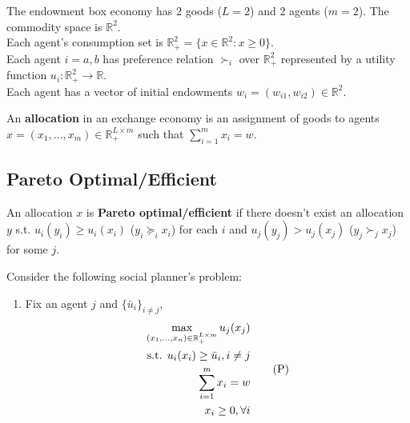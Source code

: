 \documentclass[11pt]{elegantbook}
\begin{document}
\begin{example}
    The endowment box economy has $2$ goods ($L=2$) and 2 agents ($m=2$). The commodity space is $\mathbb{R}^2$.\\
    Each agent's consumption set is $\mathbb{R}_+^2=\{x\in \mathbb{R}^2:x\geq 0\}$.\\
    Each agent $i=a,b$ has preference relation $\succ_i$ over $\mathbb{R}_+^2$ represented by a utility function $u_i: \mathbb{R}_+^2 \rightarrow \mathbb{R}$.\\
    Each agent has a vector of initial endowments $w_i=(w_{i1},w_{i2})\in \mathbb{R}^2$.
\end{example}

\begin{definition}[Allocation]
    \normalfont
    An \textbf{allocation} in an exchange economy is an assignment of goods to agents $x=(x_1,...,x_m)\in \mathbb{R}_+^{L\times m}$ such that $\sum_{i=1}^mx_i=w$.
\end{definition}


\subsection{Pareto Optimal/Efficient}
\begin{definition}
    \normalfont
    An allocation $x$ is \textbf{Pareto optimal/efficient} if there doesn't exist an allocation $y$ s.t. $u_i(y_i)\geq u_i(x_i)$ ($y_i\succeq_i x_i$) for each $i$ and $u_j(y_j)> u_j(x_j)$ ($y_j\succ_j x_j$) for some $j$.
\end{definition}

Consider the following social planner's problem:
\begin{enumerate}[$\circ$]
    \item Fix an agent $j$ and $\{\bar{u}_i\}_{i\neq j}$,
    \begin{equation}
        \begin{aligned}
            \max_{(x_1,...,x_n)\in \mathbb{R}^{L\times m}_+} u_j(x_j)\\
            \textnormal{s.t. } u_i(x_i)\geq \bar{u}_i, i\neq j\\
            \sum_{i=1}^mx_i=w\\
            x_i\geq 0, \forall i
        \end{aligned}
        \tag{P}
        \label{Planner P}
    \end{equation}
\end{enumerate}
\end{document}
